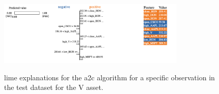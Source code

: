 \begin{figure}
    \centering
    \includegraphics[width=0.8\textwidth]{figures/a2c_lime_v.png}
    \label{fig:a2c_lime_v}
    \caption{\acrshort{lime} explanations for the \acrshort{a2c} algorithm for a specific observation in the test dataset for the V asset.}
\end{figure}

